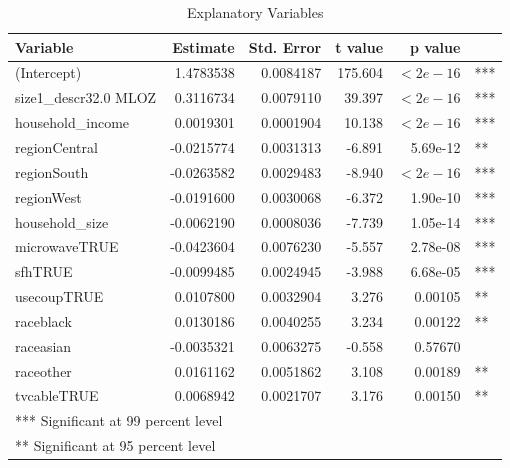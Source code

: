 \documentclass[11pt, fleqn]{article}
\begin{document}
\begin{table}
  \begin{tabular}{l r r r r l}
    \toprule
    Variable            & Estimate  & Std. Error &  t value  & p value & \\
    \midrule
    (Intercept)           & 1.4783538 & 0.0084187 & 175.604 & $<2e-16$ & ***\\
    size1\_descr32.0 MLOZ  & 0.3116734 & 0.0079110 & 39.397 & $<2e-16$ & *** \\
    household\_income      & 0.0019301 & 0.0001904 & 10.138 & $<2e-16$ & *** \\
    regionCentral         & -0.0215774 & 0.0031313 & -6.891 & 5.69e-12 & ** \\
    regionSouth           & -0.0263582 & 0.0029483 & -8.940 & $<2e-16$ & *** \\
    regionWest            & -0.0191600 & 0.0030068 & -6.372 & 1.90e-10 & *** \\
    household\_size        & -0.0062190 & 0.0008036 & -7.739 & 1.05e-14 & *** \\
    microwaveTRUE         & -0.0423604 & 0.0076230 & -5.557 & 2.78e-08 & *** \\
    sfhTRUE               & -0.0099485 & 0.0024945 & -3.988 & 6.68e-05 & *** \\
    usecoupTRUE           & 0.0107800 & 0.0032904 & 3.276 & 0.00105 & **  \\
    raceblack             & 0.0130186 & 0.0040255 & 3.234 & 0.00122 & **  \\
    raceasian             & -0.0035321 & 0.0063275 & -0.558 & 0.57670 & \\
    raceother             & 0.0161162 & 0.0051862 & 3.108 & 0.00189 & **  \\
    tvcableTRUE           & 0.0068942 & 0.0021707 & 3.176 & 0.00150 & **  \\
    \midrule
    \multicolumn{6}{l}{*** Significant at 99 percent level}\\
    \multicolumn{6}{l}{** Significant at 95 percent level}\\
    \bottomrule
  \end{tabular}
  \caption{Explanatory Variables}
  \label{tab:regress}
\end{table}
\end{document}
